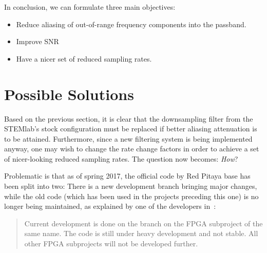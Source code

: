 In conclusion, we can formulate three main objectives:
\begin{itemize}\tightlist
    \item
        Reduce  aliasing   of  out-of-range  frequency  components   into  the
        passband.
    \item
        Improve SNR
    \item
        Have a nicer set of reduced sampling rates.
\end{itemize}

%
%
\section{Possible Solutions} %
\label{sec:mission:possible_solutions}

Based on the  previous section, it is clear that  the downsampling filter from
the \mbox{STEMlab's} stock  configuration must be replaced  if better aliasing
attenuation is  to be attained. Furthermore,  since a new filtering  system is
being implemented  anyway, one may wish  to change the rate  change factors in
order to achieve  a set of nicer-looking reduced  sampling rates. The question
now becomes: \emph{How}?

Problematic is that  as of spring 2017,  the official code by  Red Pitaya base
has been  split into  two: There is  a new  development branch  bringing major
changes, while  the old code  (which has been  used in the  projects preceding
this one) is no longer being maintained, as explained by one of the developers
in~\cite{pita:github:issue:huesser:jeras}:
\begin{quote}
    Current  development  is done  on  the   branch  on  the
    FPGA  subproject of  the same  name.  The  code is  still under  heavy
    development and  not stable. All  other FPGA  subprojects will  not be
    developed further.
\end{quote}

